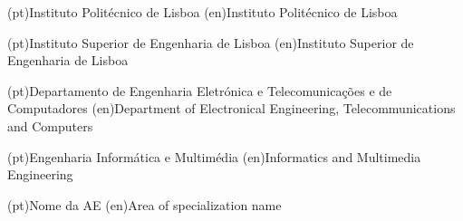 
%



\ncuniversity*(pt){Instituto Politécnico de Lisboa}
\ncuniversity*(en){Instituto Politécnico de Lisboa}

\ncschool*(pt){Instituto Superior de Engenharia de Lisboa}
\ncschool*(en){Instituto Superior de Engenharia de Lisboa}

\ncdepartment*(pt){Departamento de Engenharia Eletrónica e Telecomunicações e de Computadores}
\ncdepartment*(en){Department of Electronical Engineering, Telecommunications and Computers}




\ncmajorfield(pt){Engenharia Informática e Multimédia}
\ncmajorfield(en){Informatics and Multimedia Engineering}



\ncspecialization(pt){Nome da AE}
\ncspecialization(en){Area of specialization name}
